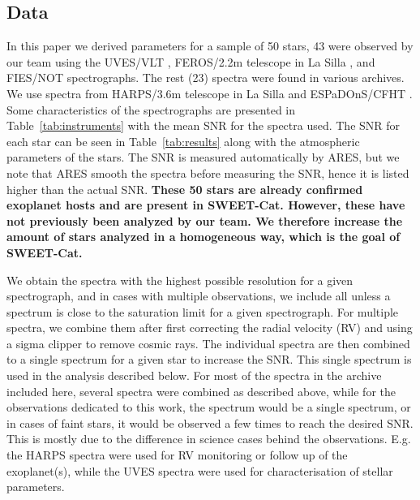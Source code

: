 \documentclass{aa}
\begin{document}
\subsection{Data}
\label{sec:data}
In this paper we derived parameters for a sample of 50 stars, 43 were observed
by our team using the UVES/VLT \citep{UVES}, FEROS/2.2m telescope in La Silla
\citep{FEROS}, and FIES/NOT \citep{FIES} spectrographs. The rest (23) spectra
were found in various archives. We use spectra from HARPS/3.6m telescope in La
Silla \citep{HARPS} and ESPaDOnS/CFHT \citep{ESPADONS}. Some characteristics of
the spectrographs are presented in Table~\ref{tab:instruments} with the mean SNR
for the spectra used. The SNR for each star can be seen in
Table~\ref{tab:results} along with the atmospheric parameters of the stars. The
SNR is measured automatically by ARES, but we note that ARES smooth the spectra
before measuring the SNR, hence it is listed higher than the actual SNR. {\bf
These 50 stars are already confirmed exoplanet hosts and are present in
SWEET-Cat. However, these have not previously been analyzed by our team. We
therefore increase the amount of stars analyzed in a homogeneous way, which is
the goal of SWEET-Cat.}

We obtain the spectra with the highest possible resolution for a given
spectrograph, and in cases with multiple observations, we include all unless a
spectrum is close to the saturation limit for a given spectrograph. For multiple
spectra, we combine them after first correcting the radial velocity (RV) and
using a sigma clipper to remove cosmic rays. The individual spectra are then
combined to a single spectrum for a given star to increase the SNR. This single
spectrum is used in the analysis described below. For most of the spectra in the
archive included here, several spectra were combined as described above, while
for the observations dedicated to this work, the spectrum would be a single
spectrum, or in cases of faint stars, it would be observed a few times to reach
the desired SNR. This is mostly due to the difference in science cases behind
the observations. E.g. the HARPS spectra were used for RV monitoring or follow
up of the exoplanet(s), while the UVES spectra were used for characterisation of
stellar parameters.
\end{document}
